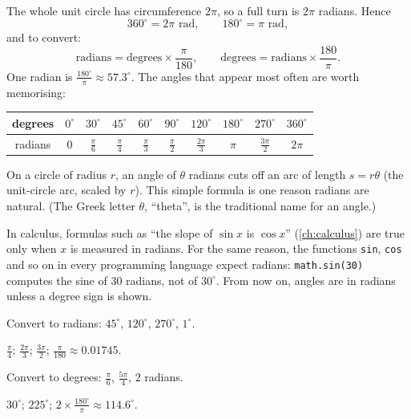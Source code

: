 The whole unit circle has circumference $2\pi$, so a full turn is $2\pi$
radians. Hence
\[
  360^\circ = 2\pi \text{ rad}, \qquad 180^\circ = \pi \text{ rad},
\]
and to convert:
\[
  \text{radians} = \text{degrees} \times \frac{\pi}{180}, \qquad
  \text{degrees} = \text{radians} \times \frac{180}{\pi}.
\]
One radian is $\tfrac{180^\circ}{\pi} \approx 57.3^\circ$. The angles that
appear most often are worth memorising:
\begin{center}
\renewcommand{\arraystretch}{1.3}
\begin{tabular}{c|ccccccccc}
degrees & $0^\circ$ & $30^\circ$ & $45^\circ$ & $60^\circ$ & $90^\circ$ &
  $120^\circ$ & $180^\circ$ & $270^\circ$ & $360^\circ$\\
\hline
radians & $0$ & $\frac{\pi}{6}$ & $\frac{\pi}{4}$ & $\frac{\pi}{3}$ &
  $\frac{\pi}{2}$ & $\frac{2\pi}{3}$ & $\pi$ & $\frac{3\pi}{2}$ & $2\pi$
\end{tabular}
\end{center}

On a circle of radius $r$, an angle of $\theta$ radians cuts off an arc of
length $s = r\theta$ (the unit-circle arc, scaled by $r$). This simple formula
is one reason radians are natural. (The Greek letter $\theta$, ``theta'', is
the traditional name for an angle.)

\begin{remark}
In calculus, formulas such as ``the slope of $\sin x$ is $\cos x$''
(\cref{ch:calculus}) are true only when $x$ is measured in radians. For the
same reason, the functions \texttt{sin}, \texttt{cos} and so on in every
programming language expect radians: \texttt{math.sin(30)} computes the sine of
$30$ radians, not of $30^\circ$. From now on, angles are in radians unless a
degree sign is shown.
\end{remark}

\sectionexercises

\begin{exercise}
Convert to radians: $45^\circ$, $120^\circ$, $270^\circ$, $1^\circ$.
\end{exercise}
\begin{solution}
$\tfrac{\pi}{4}$; $\tfrac{2\pi}{3}$; $\tfrac{3\pi}{2}$;
$\tfrac{\pi}{180} \approx 0.01745$.
\end{solution}

\begin{exercise}
Convert to degrees: $\tfrac{\pi}{6}$, $\tfrac{5\pi}{4}$, $2$ radians.
\end{exercise}
\begin{solution}
$30^\circ$; $225^\circ$; $2 \times \tfrac{180^\circ}{\pi} \approx 114.6^\circ$.
\end{solution}

